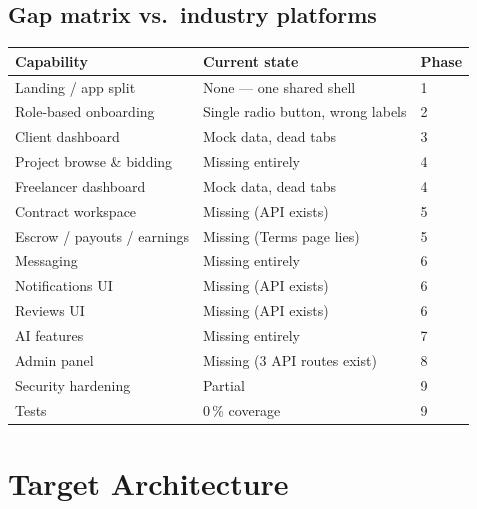 \documentclass[11pt,a4paper]{article}
\begin{document}
\subsection{Gap matrix vs.\ industry platforms}
\begin{table}[h]
\small
\begin{tabularx}{\textwidth}{@{}lXl@{}}
\toprule
\textbf{Capability} & \textbf{Current state} & \textbf{Phase} \\
\midrule
Landing / app split          & None --- one shared shell            & 1 \\
Role-based onboarding        & Single radio button, wrong labels    & 2 \\
Client dashboard             & Mock data, dead tabs                 & 3 \\
Project browse \& bidding    & Missing entirely                     & 4 \\
Freelancer dashboard         & Mock data, dead tabs                 & 4 \\
Contract workspace           & Missing (API exists)                 & 5 \\
Escrow / payouts / earnings  & Missing (Terms page lies)            & 5 \\
Messaging                    & Missing entirely                     & 6 \\
Notifications UI             & Missing (API exists)                 & 6 \\
Reviews UI                   & Missing (API exists)                 & 6 \\
AI features                  & Missing entirely                     & 7 \\
Admin panel                  & Missing (3 API routes exist)         & 8 \\
Security hardening           & Partial                              & 9 \\
Tests                        & 0\,\% coverage                       & 9 \\
\bottomrule
\end{tabularx}
\end{table}

\section{Target Architecture}
\end{document}

